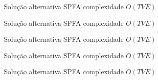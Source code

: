 \begin{frame}[fragile]{Solução alternativa SPFA complexidade $O(TVE)$}
\end{frame}

\begin{frame}[fragile]{Solução alternativa SPFA complexidade $O(TVE)$}
\end{frame}

\begin{frame}[fragile]{Solução alternativa SPFA complexidade $O(TVE)$}
\end{frame}

\begin{frame}[fragile]{Solução alternativa SPFA complexidade $O(TVE)$}
\end{frame}

\begin{frame}[fragile]{Solução alternativa SPFA complexidade $O(TVE)$}
\end{frame}


